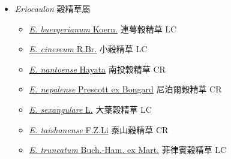 
  \begin{itemize}
 \item[] \textit{Eriocaulon} 穀精草屬
                    
  \begin{itemize}
        \item[] \href{http://www.theplantlist.org/tpl1.1/search?q=Eriocaulon+buergerianum}{\textit{E. buergerianum} Koern.}   連萼穀精草 LC
        \item[] \href{http://www.theplantlist.org/tpl1.1/search?q=Eriocaulon+cinereum}{\textit{E. cinereum} R.Br.}   小穀精草 LC
        \item[] \href{http://www.theplantlist.org/tpl1.1/search?q=Eriocaulon+nantoense}{\textit{E. nantoense} Hayata}   南投穀精草 CR
        \item[] \href{http://www.theplantlist.org/tpl1.1/search?q=Eriocaulon+nepalense}{\textit{E. nepalense} Prescott ex Bongard}   尼泊爾穀精草 CR
        \item[] \href{http://www.theplantlist.org/tpl1.1/search?q=Eriocaulon+sexangulare}{\textit{E. sexangulare} L.}   大葉穀精草 LC
        \item[] \href{http://www.theplantlist.org/tpl1.1/search?q=Eriocaulon+taishanense}{\textit{E. taishanense} F.Z.Li}   泰山穀精草 CR
        \item[] \href{http://www.theplantlist.org/tpl1.1/search?q=Eriocaulon+truncatum}{\textit{E. truncatum} Buch.-Ham. ex Mart.}   菲律賓穀精草 LC
  \end{itemize}
  \end{itemize}
